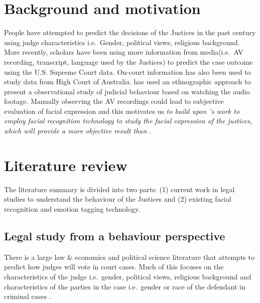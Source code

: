 \documentclass{monashthesis}
\begin{document}
\hypertarget{background-and-motivation}{%
\section{Background and motivation}\label{background-and-motivation}}

People have attempted to predict the decisions of the Justices in the past century using judge characteristics i.e.~Gender, political views, religious background. More recently, scholars\autocites{Shullman2004illusion}{chen2018justice} have been using more information from media(i.e.~AV recording, transcript, language used by the Justices) to predict the case outcome using the U.S. Supreme Court data. On-court information has also been used to study data from High Court of Australia. \textcite{tutton2018judicial} has used an ethnographic approach to present a observational study of judicial behaviour based on watching the audio footage. Manually observing the AV recordings could lead to subjective evaluation of facial expression and this motivates us \emph{to build upon \textcite{tutton2018judicial}'s work to employ facial recognition technology to study the facial expression of the justices, which will provide a more objective result than \textcite{tutton2018judicial}}.

\hypertarget{literature-review}{%
\section{Literature review}\label{literature-review}}

The literature summary is divided into two parts: (1) current work in legal studies to understand the behaviour of the Justices and (2) existing facial recognition and emotion tagging technology.

\hypertarget{legal-study-from-a-behaviour-perspective}{%
\subsection{Legal study from a behaviour perspective}\label{legal-study-from-a-behaviour-perspective}}

There is a large law \& economics and political science literature that attempts to predict how judges will vote in court cases. Much of this focuses on the characteristics of the judge i.e.~gender, political views, religious background and characteristics of the parties in the case i.e.~gender or race of the defendant in criminal cases \autocites{Stuart1962}{Peter1984}{Combining1987}{Susan1988}{Steffensmeier2001}{Kulik2003}.
\end{document}

